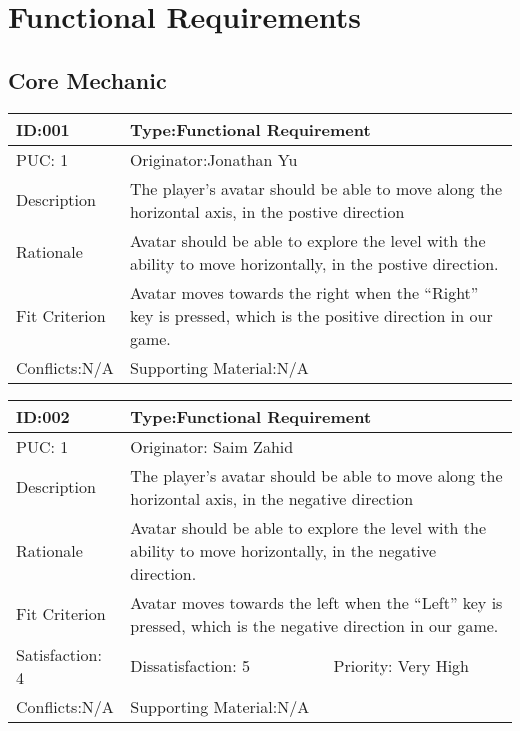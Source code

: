 \documentclass{article}
\begin{document}
	



	\newpage
	\newpage


	\section{Functional Requirements}
	\subsection{Core Mechanic}
	\begin{table}[H]
		\begin{tabular}{|l|l|l|}
			\hline
			ID:001&\multicolumn{2}{l|}{Type:Functional Requirement} \\ \hline
			PUC: 1& \multicolumn{2}{l|}{Originator:Jonathan Yu} \\ \hline
			Description & \multicolumn{2}{m{0.85\textwidth}|}{The player’s avatar should be able to move along the horizontal axis, in the postive direction }\\\hline
			Rationale & \multicolumn{2}{m{0.85\textwidth}|}{Avatar should be able to explore the level with the ability to move horizontally, in the postive direction.} \\ \hline
			Fit Criterion & \multicolumn{2}{m{0.85\textwidth}|}{Avatar moves towards the right when the “Right” key is pressed, which is the positive direction in our game.} \\ \hline
			Conflicts:N/A & \multicolumn{2}{l|}{Supporting Material:N/A} \\ \hline
		\end{tabular}
	\end{table}

	\begin{table}[H]
		\begin{tabular}{|l|l|l|}
			\hline
			ID:002&\multicolumn{2}{l|}{Type:Functional Requirement} \\ \hline
			PUC: 1& \multicolumn{2}{l|}{Originator: Saim Zahid} \\ \hline
			Description & \multicolumn{2}{m{0.85\textwidth}|}{The player’s avatar should be able to move along the horizontal axis, in the negative direction }\\\hline
			Rationale & \multicolumn{2}{m{0.85\textwidth}|}{Avatar should be able to explore the level with the ability to move horizontally, in the negative direction.} \\ \hline
			Fit Criterion & \multicolumn{2}{m{0.85\textwidth}|}{Avatar moves towards the left when the “Left” key is pressed, which is the negative direction in our game.} \\ \hline
			Satisfaction: 4 & Dissatisfaction: 5 & Priority: Very High \\ \hline
			Conflicts:N/A & \multicolumn{2}{l|}{Supporting Material:N/A} \\ \hline
		\end{tabular}
	\end{table}
\end{document}
